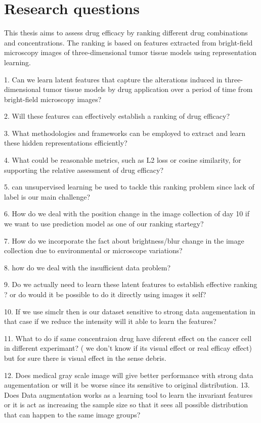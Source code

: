 \chapter{Research questions}\label{ch:Research questions}
This thesis aims to assess drug efficacy by ranking different drug combinations and concentrations. 
The ranking is based on features extracted from bright-field microscopy images of  three-dimensional tumor tissue models using
representation learning. 

1. Can we learn latent features that capture the alterations 
induced in three-dimensional tumor tissue models by drug application over a period of time from bright-field microscopy images?

2.  Will these features can effectively establish a ranking of drug efficacy?

3. What methodologies and frameworks can be employed to extract and learn these
 hidden representations efficiently?

4. What could be reasonable metrics, such as L2 loss or cosine similarity, for 
supporting the relative assessment of drug efficacy?

5. can unsupervised learning be used to tackle this ranking problem since lack of label is 
our main challenge?

6. How do we deal with the position change in the image collection of day 10 if we want to use prediction 
model as one of our ranking startegy?

7. How do we incorporate the fact about brightness/blur change in the image collection due to environmental or microscope 
variations?

8. how do we deal with the insufficient data problem?

9. Do we actually need to learn these latent features to establish effective ranking ? or do would it be possible to do it directly using images it self?

10. If we use simclr then is our dataset sensitive to strong data augementation in that case if we reduce the intensity will it able to learn the features?

11. What to do if same concentraion drug have diferent effect on the cancer cell in different experimant? ( we don't know if its visual effect or real efficay effect)
but for sure there is visual effect in the sense debris. 

12. Does medical gray scale image will give better performance with  strong data augementation or will it be worse since its sensitive to original distribution.
13. Does Data augmentation works as a learning tool to learn the invariant features or it is act as increasing the sample size so that it sees all possible distribution
 that can happen to the same image groups?

 
